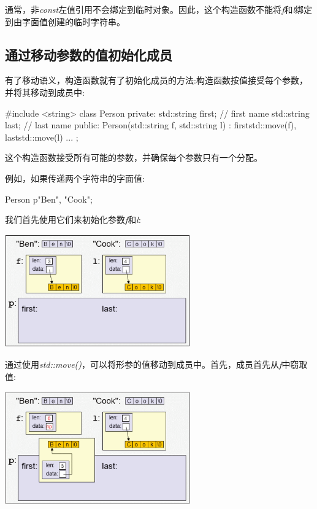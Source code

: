 通常，非\textit{const}左值引用不会绑定到临时对象。因此，这个构造函数不能将\textit{f}和\textit{l}绑定到由字面值创建的临时字符串。

\subsection{通过移动参数的值初始化成员}

有了移动语义，构造函数就有了初始化成员的方法:构造函数按值接受每个参数，并将其移动到成员中:

\begin{cppcode}
#include <string>
class Person {
private:
	std::string first; // first name
	std::string last; // last name
public:
	Person(std::string f, std::string l)
	: first{std::move(f)}, last{std::move(l)} {
	}
	...
};
\end{cppcode}

这个构造函数接受所有可能的参数，并确保每个参数只有一个分配。

例如，如果传递两个字符串的字面值:

\begin{cppcode}
Person p{"Ben", "Cook"};
\end{cppcode}

我们首先使用它们来初始化参数\textit{f}和\textit{l}:

\begin{center}
	\includegraphics[width=0.6\textwidth]{part1/ch4/images/4}
\end{center}

通过使用\textit{std::move()}，可以将形参的值移动到成员中。首先，成员首先从\textit{f}中窃取值:

\begin{center}
	\includegraphics[width=0.6\textwidth]{part1/ch4/images/5}
\end{center}

